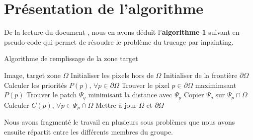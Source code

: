 \documentclass[12pt]{article}
\begin{document}






\newpage
\section{Présentation de l'algorithme}



De la lecture du document \cite{criminisi2004region}, nous en avons déduit 
l'\textbf{algorithme 1} suivant en pseudo-code  qui permet de résoudre 
le problème du trucage par inpainting.

\begin{algorithm}
    \caption{Algorithme de remplissage de la zone target}\label{alg:cap}
    \begin{algorithmic}
        \Require Image, target zone $\Omega$
        \State Initialiser les pixels hors de $\Omega$
        \State Initialiser de la frontière $\partial \Omega$
        \While{$\partial \Omega\neq\emptyset$}
            \State Calculer les priorités $P(p)$, $\forall p \in \partial \Omega$
            \State Trouver le pixel $ p \in \partial \Omega$ maximimsant $P(p)$
            \State Trouver le patch $\Psi_{q}$ minimisant la distance avec $\Psi_{p}$
            \State Copier $\Psi_{q}$ sur $\Psi_{p} \cap \Omega$
            \State Calculer $C(p)$, $\forall p \in \Psi_{p} \cap \Omega $
            \State Mettre à jour $\Omega$ et $\partial \Omega $
        \EndWhile
    \end{algorithmic}
\end{algorithm}



\vspace{0.3cm}

Nous avons fragmenté le travail en plusieurs sous problèmes que nous 
avons ensuite répartit entre les différents membres du groupe.
\end{document}

